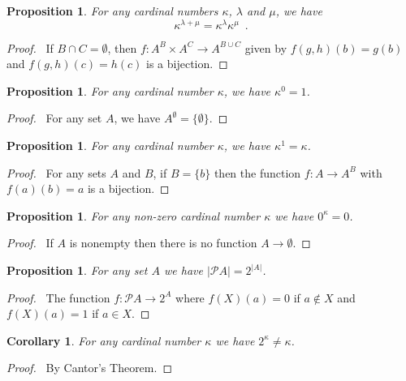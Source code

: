 \documentclass{book}
\let\qed\relax
\newtheorem{prop}[ax]{Proposition}
\newtheorem{cor}{Corollary}[ax]
\theoremstyle{definition}
\begin{document}
\begin{prop}
For any cardinal numbers $\kappa$, $\lambda$ and $\mu$, we have
\[ \kappa^{\lambda + \mu} = \kappa^\lambda \kappa^\mu \enspace .\]
\end{prop}

\begin{proof}
\pf\ If $B \cap C = \emptyset$, then $f : A^B \times A^C \rightarrow A^{B \cup C}$ given by $f(g,h)(b) = g(b)$ and $f(g,h)(c) = h(c)$ is a bijection. \qed
\end{proof}

\begin{prop}
For any cardinal number $\kappa$, we have $\kappa^0 = 1$.
\end{prop}

\begin{proof}
\pf\ For any set $A$, we have $A^\emptyset = \{ \emptyset \}$. \qed
\end{proof}

\begin{prop}
For any cardinal number $\kappa$, we have $\kappa^1 = \kappa$.
\end{prop}

\begin{proof}
\pf\ For any sets $A$ and $B$, if $B = \{b\}$ then the function $f : A \rightarrow A^B$ with $f(a)(b) = a$ is a bijection. \qed
\end{proof}

\begin{prop}
For any non-zero cardinal number $\kappa$ we have $0^\kappa = 0$.
\end{prop}

\begin{proof}
\pf\ If $A$ is nonempty then there is no function $A \rightarrow \emptyset$. \qed
\end{proof}

\begin{prop}
For any set $A$ we have $|\mathcal{P} A| = 2^{|A|}$.
\end{prop}

\begin{proof}
\pf\ The function $f : \mathcal{P} A \rightarrow 2^A$ where $f(X)(a) = 0$ if $a \notin X$ and $f(X)(a) = 1$ if $a \in X$. \qed
\end{proof}

\begin{cor}
For any cardinal number $\kappa$ we have $2^\kappa \neq \kappa$.
\end{cor}

\begin{proof}
\pf\ By Cantor's Theorem. \qed
\end{proof}
\end{document}
